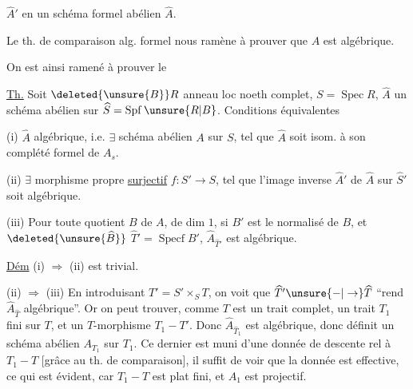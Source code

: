 
$\widehat A'$ en un schéma formel abélien $\widehat A$.

Le th. de comparaison alg. formel nous ramène à prouver que $A$ est algébrique.

On est ainsi ramené à prouver le

\uline{Th.} Soit $\deleted{\unsure{B}}R$ anneau loc noeth complet, $S=\operatorname{Spec} R$, $\widehat A$ un schéma  abélien sur $\widehat S=\operatorname{Spf}\unsure{R|B}$. Conditions équivalentes

(i) $\widehat A$ algébrique, i.e. $\exists$ schéma abélien $A$ sur $S$, tel que $\widehat A$ soit isom. à son complété formel  de $A_s$.

(ii) $\exists$ morphisme propre \uline{surjectif}  $f:S'\to S$,  tel que l'image inverse $\widehat A'$ de $\widehat A$ sur $\widehat S'$ soit algébrique.

(iii) Pour toute  quotient   $B$ de $A$, de dim $1$, si $B'$ est le normalisé de $B$, et $\deleted{\unsure{\widehat B}}$ $\widehat T'=\operatorname{Specf} B'$, \unsure{---} $\widehat A_{\widehat T'}$ est algébrique.



\uline{Dém} \quad (i) $\Rightarrow$ (ii) est trivial.

(ii) $\Rightarrow$ (iii) \quad En introduisant $T'=S'\times_S T$, on voit que $\widehat T'\unsure{-|\to}\widehat T$ ``rend $\widehat A_{\widehat T}$ algébrique''. Or on peut trouver, comme $T$ est un trait complet, un  trait $T_1$ fini  sur $T$, et un $T$-morphisme $T_1-T'$. Donc $\widehat A_{\widehat T_1}$ est algébrique, donc définit un schéma abélien $A_{T_1}$ sur $T_1$. Ce dernier est muni d'une donnée de descente rel à $T_1-T$ [grâce au th. de comparaison], il suffit  de voir que la donnée est effective, ce qui est évident, car $T_1-T$ est  plat fini, et $A_{1}$ est projectif.
